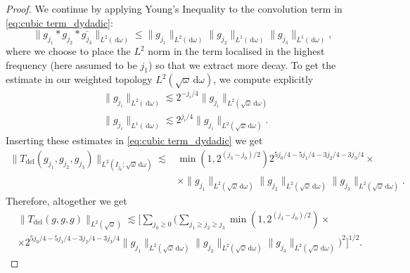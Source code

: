 \documentclass[10pt,a4paper]{amsart}
\newcommand{\dd}{{\, \mathrm d}}
\begin{document}
\begin{proof}
        We continue by applying Young's Inequality to the convolution term in \eqref{eq:cubic term_dydadic}: 
        \begin{equation}\label{eq:Young_Ineq_convolution}
         \| g_{j_1} \ast g_{j_2} \ast \overline{g_{j_3}} \|_{L^2(\dd \omega)} \leq \|g_{j_1} \|_{L^2(\dd \omega)} \|g_{j_2} \|_{L^1(\dd \omega)} \| g_{j_3} \|_{L^1(\dd \omega)}, 
         \end{equation}
        where we choose to place the $L^2$ norm in the term localised in the highest frequency (here assumed to be $j_1$) so that we extract more decay. To get the estimate in our weighted topology $L^2(\sqrt{\omega}\dd \omega)$, we compute explicitly 
        \begin{align} \label{eq:estimL2_1}
            & \|g_{j_i}\|_{L^2(\dd \omega)} \lesssim 2^{-j_i/4} \|g_{j_i}\|_{L^2(\sqrt{\omega}\dd\omega)}\\
            \label{eq:estimL2_2}
            & \|g_{j_i}\|_{L^1(\dd \omega)} \lesssim 
            2^{j_i/4} \|g_{j_i}\|_{L^2(\sqrt{\omega}\dd\omega)}.
        \end{align}
        Inserting these estimates in \eqref{eq:cubic term_dydadic} we get  
        \begin{equation}
            \begin{split}
                 \|T_{\text{del}}(g_{j_1},g_{j_2},g_{j_3})  \|_{L^2(I_{j_0};\sqrt{\omega}\dd \omega)}  
                 \lesssim  
                &\min \left(1, 2^{(j_3-j_0)/2} \right) 2^{5 j_0/4 - 5j_1/4 - 3j_2/4 - 3j_3/4} \times  \\ &\times \|g_{j_1}\|_{L^2(\sqrt{\omega}\dd\omega)}
                \| g_{j_2}\|_{L^2(\sqrt{\omega}\dd\omega)}
                \| g_{j_3}\|_{L^2(\sqrt{\omega}\dd\omega)}.
            \end{split}
        \end{equation}
        Therefore, altogether we get 
        \begin{equation}
            \begin{split}
                        &\|T_{\text{del}}(g,g,g)\|_{L^2(\sqrt{\omega})} 
                        \lesssim  
                       \Bigg[ \sum_{j_0\geq 0}
                       \Bigg( \sum_{j_1\geq j_2 \geq j_3}   
                       \min \left(1, 2^{(j_3-j_0)/2} \right) \times \\ 
                       &  \times 
                    2^{5 j_0/4 - 5j_1/4 - 3j_2/4 - 3j_3/4}\|g_{j_1}\|_{L^2(\sqrt{\omega}\dd\omega)}
                \|g_{j_2}\|_{L^2(\sqrt{\omega}\dd\omega)}
                \| g_{j_3}\|_{L^2(\sqrt{\omega}\dd\omega)} \Bigg)^2 \Bigg]^{1/2}.
            \end{split}
        \end{equation}
        

\end{proof}
\end{document}
